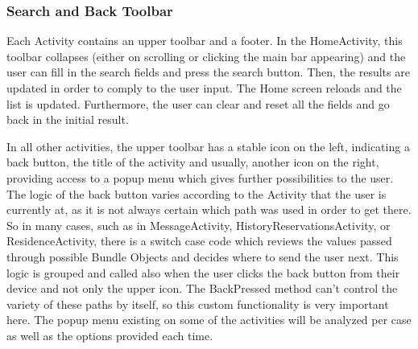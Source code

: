 \documentclass[12pt]{article}
\begin{document}
	\subsubsection{Search and Back Toolbar}
	Each Activity contains an upper toolbar and a footer. In the HomeActivity, this toolbar collapses (either on scrolling or clicking the main bar appearing) and the user can fill in the search fields and press the search button. Then, the results are updated in order to comply to the user input. The Home screen reloads and the list is updated. Furthermore, the user can clear and reset all the fields and go back in the initial result.
	
	In all other activities, the upper toolbar has a stable icon on the left, indicating a back button, the title of the activity and usually, another icon on the right, providing access to a popup menu which gives further possibilities to the user. The logic of the back button varies according to the Activity that the user is currently at, as it is not always certain which path was used in order to get there. So in many cases, such as in MessageActivity, HistoryReservationsActivity, or ResidenceActivity, there is a switch case code which reviews the values passed through possible Bundle Objects and decides where to send the user next. This logic is grouped and called also when the user clicks the back button from their device and not only the upper icon. The BackPressed method can't control the variety of these paths by itself, so this custom functionality is very important here. The popup menu existing on some of the activities will be analyzed per case as well as the options provided each time.
	
\end{document}
